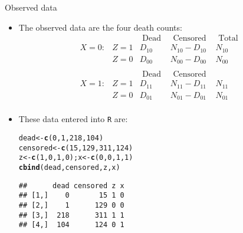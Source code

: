 \documentclass[10pt]{beamer}\usepackage[]{graphicx}\usepackage[]{color}
\makeatletter
\newcommand{\hlnum}[1]{\textcolor[rgb]{0.686,0.059,0.569}{#1}}%
\newcommand{\hlstd}[1]{\textcolor[rgb]{0.345,0.345,0.345}{#1}}%
\newcommand{\hlkwb}[1]{\textcolor[rgb]{0.69,0.353,0.396}{#1}}%
\newcommand{\hlkwd}[1]{\textcolor[rgb]{0.737,0.353,0.396}{\textbf{#1}}}%
\newenvironment{kframe}{%
 \def\at@end@of@kframe{}%
 \ifinner\ifhmode%
  \def\at@end@of@kframe{\end{minipage}}%
  \begin{minipage}{\columnwidth}%
 \fi\fi%
 \def\FrameCommand##1{\hskip\@totalleftmargin \hskip-\fboxsep
 \colorbox{shadecolor}{##1}\hskip-\fboxsep
     \hskip-\linewidth \hskip-\@totalleftmargin \hskip\columnwidth}%
 \MakeFramed {\advance\hsize-\width
   \@totalleftmargin\z@ \linewidth\hsize
   \@setminipage}}%
 {\par\unskip\endMakeFramed%
 \at@end@of@kframe}
\newenvironment{knitrout}{}{} %
\makeatother
\begin{document}
\begin{frame}[fragile]{Observed data}
	\begin{itemize}
		\item The observed data are the four death counts:
		$$
		\begin{array}{llccc} 
		&      & \text { Dead } & \text { Censored } & \text{ Total }\\
		X=0: & Z=1 & D_{10} & N_{10}-D_{10} & N_{10}\\
		& Z=0 & D_{00} & N_{00}-D_{00} & N_{00}\\
		& & & \\
		&  & \text { Dead } & \text { Censored } \\
		X=1:&  Z=1 & D_{11} & N_{11}-D_{11} & N_{11}\\
		&  Z=0    & D_{01} & N_{01}-D_{01} & N_{01}\\
		\end{array}
		$$
		\item These data entered into \texttt{R} are:
\begin{knitrout}\small
{}\color{fgcolor}\begin{kframe}
\begin{alltt}
\hlstd{dead} \hlkwb{<-} \hlkwd{c}\hlstd{(}\hlnum{0}\hlstd{,}\hlnum{1}\hlstd{,}\hlnum{218}\hlstd{,}\hlnum{104}\hlstd{)}
\hlstd{censored} \hlkwb{<-} \hlkwd{c}\hlstd{(}\hlnum{15}\hlstd{,}\hlnum{129}\hlstd{,}\hlnum{311}\hlstd{,}\hlnum{124}\hlstd{)}
\hlstd{z} \hlkwb{<-} \hlkwd{c}\hlstd{(}\hlnum{1}\hlstd{,}\hlnum{0}\hlstd{,}\hlnum{1}\hlstd{,}\hlnum{0}\hlstd{); x} \hlkwb{<-} \hlkwd{c}\hlstd{(}\hlnum{0}\hlstd{,}\hlnum{0}\hlstd{,}\hlnum{1}\hlstd{,}\hlnum{1}\hlstd{)}
\hlkwd{cbind}\hlstd{(dead,censored,z,x)}
\end{alltt}
\begin{verbatim}
##      dead censored z x
## [1,]    0       15 1 0
## [2,]    1      129 0 0
## [3,]  218      311 1 1
## [4,]  104      124 0 1
\end{verbatim}
\end{kframe}
\end{knitrout}
	
	\end{itemize}
\end{frame}
\end{document}
